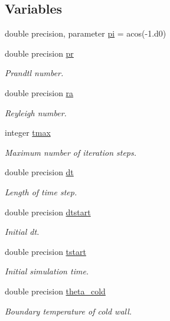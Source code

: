 \subsection*{Variables}
\begin{DoxyCompactItemize}
\item 
double precision, parameter \hyperlink{namespaceglobal_a2eeeef6cb4401e0205ced808c718dead}{pi} = acos(-\/1.d0)
\item 
double precision \hyperlink{namespaceglobal_a31749f11f262d021576cd0d09bdc79c2}{pr}
\begin{DoxyCompactList}\small\item\em Prandtl number. \end{DoxyCompactList}\item 
double precision \hyperlink{namespaceglobal_a7b363950bb58d4e52dda12a928b2b9e2}{ra}
\begin{DoxyCompactList}\small\item\em Reyleigh number. \end{DoxyCompactList}\item 
integer \hyperlink{namespaceglobal_ac8816f9dd096716fb9b7e61d57cc5189}{tmax}
\begin{DoxyCompactList}\small\item\em Maximum number of iteration steps. \end{DoxyCompactList}\item 
double precision \hyperlink{namespaceglobal_a24d27ecfb0e7d422997122c9345bac8b}{dt}
\begin{DoxyCompactList}\small\item\em Length of time step. \end{DoxyCompactList}\item 
double precision \hyperlink{namespaceglobal_a3c8fbc22da61f7188e79bad2b9ba1d16}{dtstart}
\begin{DoxyCompactList}\small\item\em Initial dt. \end{DoxyCompactList}\item 
double precision \hyperlink{namespaceglobal_a07363365436fd22a91cdb5a847b4bb88}{tstart}
\begin{DoxyCompactList}\small\item\em Initial simulation time. \end{DoxyCompactList}\item 
double precision \hyperlink{namespaceglobal_a367640054e0083add94204f1a61bd61a}{theta\+\_\+cold}
\begin{DoxyCompactList}\small\item\em Boundary temperature of cold wall. \end{DoxyCompactList}\item 

\end{DoxyCompactItemize}
